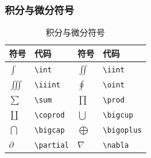\documentclass{article}
\begin{document}
\subsubsection{积分与微分符号}
\begin{table}[H]
    \centering
    \begin{tabular}{>{\centering\arraybackslash}p{2cm}>{\centering\arraybackslash}p{3cm}>{\centering\arraybackslash}p{2cm}>{\centering\arraybackslash}p{3cm}}
        \toprule
        \textbf{符号} & \textbf{代码}     & \textbf{符号} & \textbf{代码}      \\
        \midrule
        $\int$      & \verb|\int|     & $\iint$     & \verb|\iint|     \\
        $\iiint$    & \verb|\iiint|   & $\oint$     & \verb|\oint|     \\
        $\sum$      & \verb|\sum|     & $\prod$     & \verb|\prod|     \\
        $\coprod$   & \verb|\coprod|  & $\bigcup$   & \verb|\bigcup|   \\
        $\bigcap$   & \verb|\bigcap|  & $\bigoplus$ & \verb|\bigoplus| \\
        $\partial$  & \verb|\partial| & $\nabla$    & \verb|\nabla|    \\
        \bottomrule
    \end{tabular}
    \caption{积分与微分符号}
\end{table}
\end{document}
